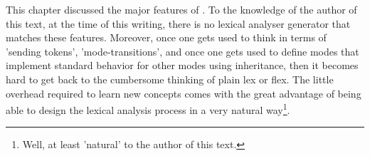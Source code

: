 This chapter discussed the major features of {\quex}. To the knowledge of the
author of this text, at the time of this writing, there is no lexical analyser
generator that matches these features. Moreover, once one gets used to think
in terms of 'sending tokens', 'mode-transitions', and once one gets used to
define modes that implement standard behavior for other modes using
inheritance, then it becomes hard to get back to the cumbersome thinking of
plain lex or flex. The little overhead required to learn new concepts comes
with the great advantage of being able to design the lexical analysis process
in a very natural way\footnote{Well, at least 'natural' to the author of this
  text.}.


